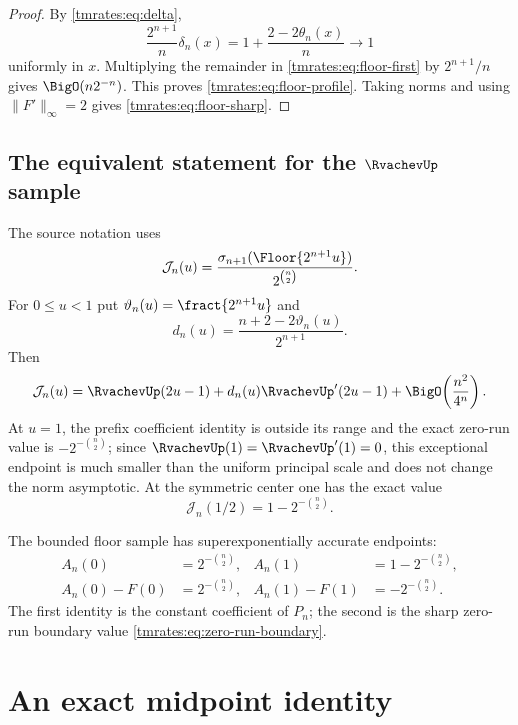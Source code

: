 \documentclass[11pt,oneside]{article}
\theoremstyle{definition}
\theoremstyle{remark}
\begin{document}
\begin{proof}
By \eqref{tmrates:eq:delta},
\[
 \frac{2^{n+1}}n\delta_n(x)
 =1+\frac{2-2\theta_n(x)}n\longrightarrow1
\]
uniformly in $x$.  Multiplying the remainder in \eqref{tmrates:eq:floor-first} by
$2^{n+1}/n$ gives $\BigO(n2^{-n})$.  This proves \eqref{tmrates:eq:floor-profile}.  Taking norms and
using $\|F'\|_\infty=2$ gives \eqref{tmrates:eq:floor-sharp}.
\end{proof}

\subsection{The equivalent statement for the \texorpdfstring{$\RvachevUp$}{Up} sample}

The source notation uses
\begin{equation}
 \mathcal J_n(u)
 =\frac{\sigma_{n+1}(\Floor{2^{n+1}u})}{2^{\binom n2}}.
\end{equation}
For $0\le u<1$ put $\vartheta_n(u)=\fract{2^{n+1}u}$ and
\begin{equation}
 d_n(u)=\frac{n+2-2\vartheta_n(u)}{2^{n+1}}.
\end{equation}
Then
\begin{equation}
 \mathcal J_n(u)
 =\RvachevUp(2u-1)+d_n(u)\RvachevUp'(2u-1)
  +\BigO\!\left(\frac{n^2}{4^n}\right).                  \label{tmrates:eq:J-expansion}
\end{equation}
At $u=1$, the prefix coefficient identity is outside its range and the exact zero-run value is
$-2^{-\binom n2}$; since $\RvachevUp(1)=\RvachevUp'(1)=0$, this exceptional endpoint is much smaller than
the uniform principal scale and does not change the norm asymptotic.
At the symmetric center one has the exact value
\begin{equation}
 \mathcal J_n(1/2)=1-2^{-\binom n2}.
 \label{tmrates:eq:J-half}
\end{equation}

The bounded floor sample has superexponentially accurate endpoints:
\begin{align}
 A_n(0)&=2^{-\binom n2}, &
 A_n(1)&=1-2^{-\binom n2},
 \label{tmrates:eq:endpoint-values}\\
 A_n(0)-F(0)&=2^{-\binom n2}, &
 A_n(1)-F(1)&=-2^{-\binom n2}.
 \label{tmrates:eq:endpoint-errors}
\end{align}
The first identity is the constant coefficient of $P_n$; the second is the sharp
zero-run boundary value \eqref{tmrates:eq:zero-run-boundary}.

\section{An exact midpoint identity}
\label{tmrates:sec:midpoint}
\end{document}
